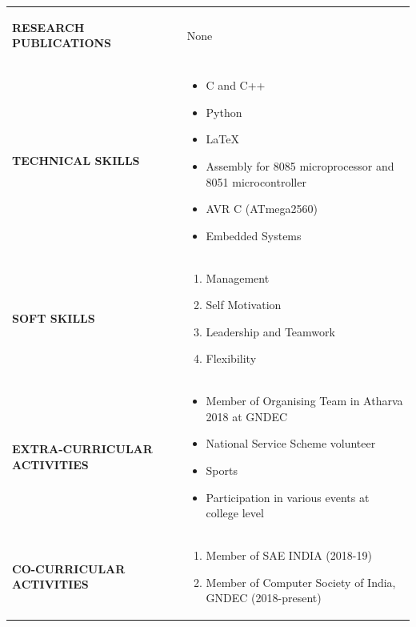 \documentclass[10pt,doublespace]{article}
\begin{document}
\begin{tabular}{p{3cm}  p{10cm} }
\begin{flushleft} \textbf{RESEARCH PUBLICATIONS}\end{flushleft}&\begin{flushleft} None \end{flushleft}\\
\begin{flushleft} \textbf{TECHNICAL SKILLS}\end{flushleft}&
\begin{itemize}
\item C and C++
\item Python
\item \LaTeX
\item Assembly for 8085 microprocessor and 8051 microcontroller
\item AVR C (ATmega2560)
\item Embedded Systems
\end{itemize}\\
\begin{flushleft} \textbf{SOFT SKILLS}\end{flushleft}&
\begin{enumerate}
\item Management
\item Self Motivation
\item Leadership and Teamwork
\item Flexibility
\end{enumerate}\\
\begin{flushleft} \textbf{EXTRA-CURRICULAR ACTIVITIES}\end{flushleft}&
\begin{itemize}
\item Member of Organising Team in Atharva 2018 at GNDEC
\item National Service Scheme volunteer
\item Sports
\item Participation in various events at college level
\end{itemize}\\
\begin{flushleft} \textbf{CO-CURRICULAR ACTIVITIES}\end{flushleft}&
\begin{enumerate}
\item Member of SAE INDIA (2018-19)
\item Member of Computer Society of India, GNDEC (2018-present)

\end{enumerate}
\end{tabular}
\end{document}
